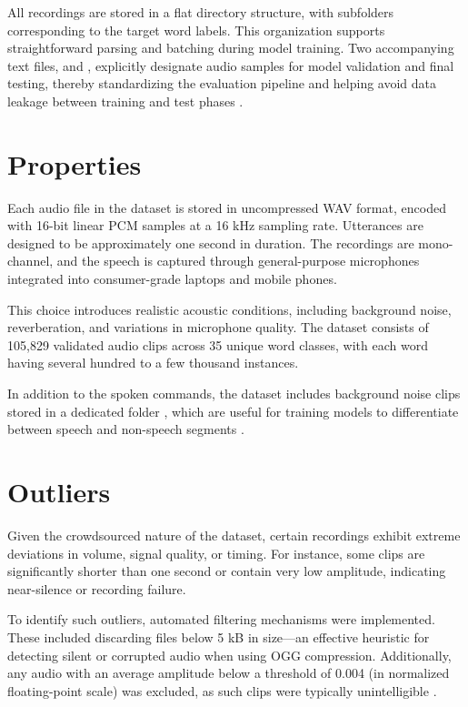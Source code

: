 \bigskip

All recordings are stored in a flat directory structure, with subfolders corresponding to the target word labels. This organization supports straightforward parsing and batching during model training. Two accompanying text files,  and , explicitly designate audio samples for model validation and final testing, thereby standardizing the evaluation pipeline and helping avoid data leakage between training and test phases \cite{Warden:2020}.

\section{Properties}

Each audio file in the dataset is stored in uncompressed WAV format, encoded with 16-bit linear PCM samples at a 16 kHz sampling rate. Utterances are designed to be approximately one second in duration. The recordings are mono-channel, and the speech is captured through general-purpose microphones integrated into consumer-grade laptops and mobile phones.

\bigskip

This choice introduces realistic acoustic conditions, including background noise, reverberation, and variations in microphone quality. The dataset consists of 105,829 validated audio clips across 35 unique word classes, with each word having several hundred to a few thousand instances.

\bigskip

In addition to the spoken commands, the dataset includes background noise clips stored in a dedicated folder , which are useful for training models to differentiate between speech and non-speech segments \cite{Warden:2020}.

\section{Outliers}

Given the crowdsourced nature of the dataset, certain recordings exhibit extreme deviations in volume, signal quality, or timing. For instance, some clips are significantly shorter than one second or contain very low amplitude, indicating near-silence or recording failure.

\bigskip

To identify such outliers, automated filtering mechanisms were implemented. These included discarding files below 5 kB in size—an effective heuristic for detecting silent or corrupted audio when using OGG compression. Additionally, any audio with an average amplitude below a threshold of 0.004 (in normalized floating-point scale) was excluded, as such clips were typically unintelligible \cite{Warden:2020}.

